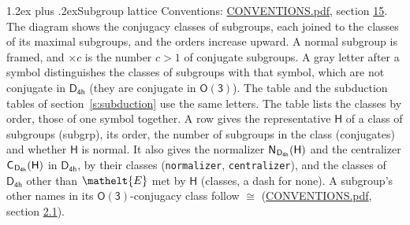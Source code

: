 \documentclass[10pt,a4paper]{article}
\makeatletter
\renewcommand\section{\@startsection{section}{1}{\z@}{-3ex plus -1ex minus -.2ex}%
  {1.2ex plus .2ex}{\normalfont\large\sffamily\bfseries\color{parttitle}}}
\numberwithin{equation}{section}
\newcommand{\eltfont}[1]{{\let\sigma\eltsigma\mathelt{#1}}}
\newcommand{\grp}[1]{\mathsf{#1}}
\newcommand{\cls}[1]{\eltfont{#1}}
\newcommand{\samecls}{\cong}
\newcommand{\hairsp}{\mkern1mu}
\makeatother
\begin{document}
\section{Subgroup lattice}\label{s:subgroups}
Conventions: \href{../../CONVENTIONS.pdf}{CONVENTIONS.pdf}, section \href{../../CONVENTIONS.pdf\#conv.15}{15}.
The diagram shows the conjugacy classes of subgroups, each joined to the classes of its maximal subgroups, and the orders increase upward. A normal subgroup is framed, and ${\times}c$ is the number $c > 1$ of conjugate subgroups. A gray letter after a symbol distinguishes the classes of subgroups with that symbol, which are not conjugate in $\grp{D_{4h}}$ (they are conjugate in \href{O3.pdf}{$\grp{O(3)}$}). The table and the subduction tables of section~\ref{s:subduction} use the same letters. The table lists the classes by order, those of one symbol together. \label{n:group.H}\label{n:head.subgroup}\label{n:head.order}\label{n:head.conjugates}\label{n:head.normal}A row gives the representative $\grp{H}$ of a class of subgroups (subgrp), its order, the number of subgroups in the class (conjugates) and whether $\grp{H}$ is normal. \label{n:group.normalizer}\label{n:group.centralizer}\label{n:head.classes}It also gives the normalizer $\grp{N}_{\hairsp \grp{D_{4h}}}(\grp{H})$ and the centralizer $\grp{C}_{\hairsp \grp{D_{4h}}}(\grp{H})$ in $\grp{D_{4h}}$, by their classes (\texttt{normalizer}, \texttt{centralizer}), and the classes of $\grp{D_{4h}}$ other than $\cls{E}$ met by $\grp{H}$ (classes, a dash for none). A subgroup's other names in its \href{O3.pdf}{$\grp{O(3)}$}-conjugacy class follow $\samecls$ (\href{../../CONVENTIONS.pdf}{CONVENTIONS.pdf}, section \href{../../CONVENTIONS.pdf\#conv.2.1}{2.1}).
\end{document}
